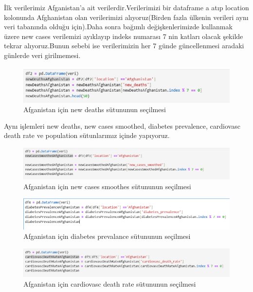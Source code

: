 \documentclass[12pt, a4paper]{article}
\begin{document}
\newline İlk verilerimiz Afganistan'a ait verilerdir.Verilerimizi bir dataframe a atıp location kolonunda Afghanistan olan verilerimizi alıyoruz(Birden fazla ülkenin verileri aynı veri tabanında olduğu için).Daha sonra bağımlı değişkenlerimizde kullanmak  üzere new cases verilemizi ayıklayıp indeks numarası 7 nin katları olacak şekilde tekrar alıyoruz.Bunun sebebi ise verilerimizin her 7 günde güncellenmesi aradaki günlerde veri girilmemesi.
\begin{figure}[!htbp] 
	
	\centering
	\includegraphics[angle=0, width=\textwidth]{4.png}
	\caption{Afganistan için new deaths sütununun seçilmesi}
\end{figure}
\newline Aynı işlemleri new deaths, new cases smoothed, diabetes prevalence, cardiovasc death rate ve population sütunlarımız içinde yapıyoruz.
\begin{figure}[!htbp] 
	
	\centering
	\includegraphics[angle=0, width=\textwidth]{5.png}
	\caption{Afganistan için new cases smoothes sütununun seçilmesi}
\end{figure}
\begin{figure}[!htbp] 
	
	\centering
	\includegraphics[angle=0, width=\textwidth]{6.png}
	\caption{Afganistan için diabetes prevalance sütununun seçilmesi}
\end{figure}
\begin{figure}[!htbp] 
	
	\centering
	\includegraphics[angle=0, width=\textwidth]{7.png}
	\caption{Afganistan için cardiovasc death rate sütununun seçilmesi}
\end{figure}
\end{document}
